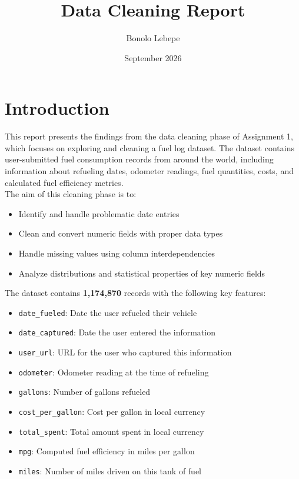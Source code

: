 \documentclass{article}
\title{Data Cleaning Report}
\author{Bonolo Lebepe}
\date{September 2026}
\begin{document}
\maketitle

\section{Introduction}

This report presents the findings from the data cleaning phase of Assignment 1, which focuses on exploring and cleaning a fuel log dataset. The dataset contains user-submitted fuel consumption records from around the world, including information about refueling dates, odometer readings, fuel quantities, costs, and calculated fuel efficiency metrics.\\




The aim of this cleaning phase is to:
\begin{itemize}
    \item Identify and handle problematic date entries
    \item Clean and convert numeric fields with proper data types
    \item Handle missing values using column interdependencies
    \item Analyze distributions and statistical properties of key numeric fields\\
\end{itemize}

The dataset contains \textbf{1,174,870} records with the following key features:

\begin{itemize}
    \item \texttt{date\_fueled}: Date the user refueled their vehicle
    \item \texttt{date\_captured}: Date the user entered the information
    \item \texttt{user\_url}: URL for the user who captured this information
    \item \texttt{odometer}: Odometer reading at the time of refueling
    \item \texttt{gallons}: Number of gallons refueled
    \item \texttt{cost\_per\_gallon}: Cost per gallon in local currency
    \item \texttt{total\_spent}: Total amount spent in local currency
    \item \texttt{mpg}: Computed fuel efficiency in miles per gallon
    \item \texttt{miles}: Number of miles driven on this tank of fuel
\end{itemize}
\end{document}
